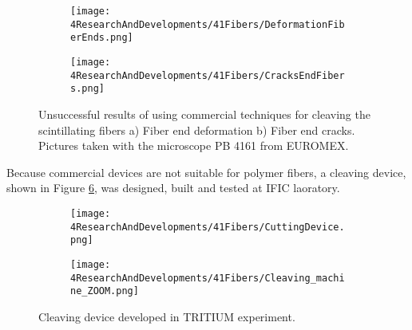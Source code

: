 \begin{figure}
\centering
    \begin{subfigure}[b]{0.5\textwidth}
    \centering
    \texttt{[image: 4ResearchAndDevelopments/41Fibers/DeformationFiberEnds.png]}  
    \caption{\label{subfig:FiberEndDeformation}}
    \end{subfigure}
    \hfill
    \begin{subfigure}[b]{0.45\textwidth}
    \centering
    \texttt{[image: 4ResearchAndDevelopments/41Fibers/CracksEndFibers.png]}  
    \caption{\label{subfig:FiberEndCracks}}
    \end{subfigure}
 \caption{Unsuccessful results of using commercial techniques for cleaving the scintillating fibers a) Fiber end deformation b) Fiber end cracks. Pictures taken with the microscope PB 4161 from EUROMEX.}
 \label{fig:BadCleavesOfFibers}
\end{figure}

Because commercial devices are not suitable for polymer fibers, a cleaving device, shown in Figure \ref{fig:CleaveTRITIUMDevice}, was designed, built and tested at IFIC laoratory.

\begin{figure}
\centering
    \begin{subfigure}[b]{0.5\textwidth}
    \centering
    \texttt{[image: 4ResearchAndDevelopments/41Fibers/CuttingDevice.png]}  
    \caption{\label{subfig:CleaveTRITIUMDevice1}}
    \end{subfigure}
    \hfill
    \begin{subfigure}[b]{0.45\textwidth}
    \centering
    \texttt{[image: 4ResearchAndDevelopments/41Fibers/Cleaving\_machine\_ZOOM.png]}  
    \caption{\label{subfig:CleaveTRITIUMDeviceZOOM}}
    \end{subfigure}
 \caption{Cleaving device developed in TRITIUM experiment. \label{fig:CleaveTRITIUMDevice}}
\end{figure}


